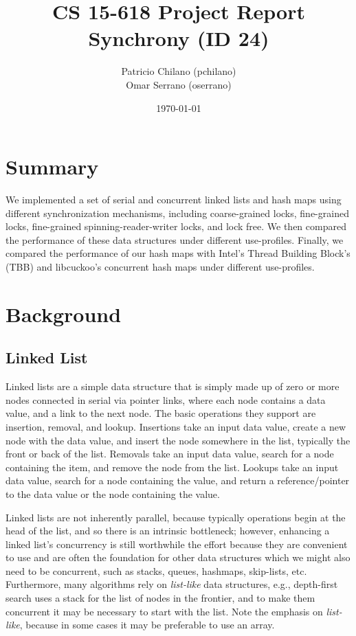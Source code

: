 \documentclass[11pt]{article}
\title{\vspace{-25pt}
\huge CS 15-618 Project Report \\
\huge Synchrony (ID 24)
}
\author{
    Patricio Chilano (pchilano) \\
    Omar Serrano (oserrano)
}
\date{\today}
\begin{document}


\maketitle

\section{Summary}
We implemented a set of serial and concurrent linked lists and hash maps using
different synchronization mechanisms, including coarse-grained locks,
fine-grained locks, fine-grained spinning-reader-writer locks, and lock free. We
then compared the performance of these data structures under different
use-profiles. Finally, we compared the performance of our hash maps with Intel's
Thread Building Block's (TBB) and libcuckoo's concurrent hash maps under different
use-profiles.

\section{Background}

\subsection{Linked List} \label{ssec:bglist}
Linked lists are a simple data structure that is simply made up of zero or more
nodes connected in serial via pointer links, where each node contains a data
value, and a link to the next node. The basic operations they support are
insertion, removal, and lookup. Insertions take an input data value, create a
new node with the data value, and insert the node somewhere in the list,
typically the front or back of the list. Removals take an input data value,
search for a node containing the item, and remove the node from the list.
Lookups take an input data value, search for a node containing the value, and
return a reference/pointer to the data value or the node containing the value.

Linked lists are not inherently parallel, because typically operations begin at
the head of the list, and so there is an intrinsic bottleneck; however,
enhancing a linked list's concurrency is still worthwhile the effort because
they are convenient to use and are often the foundation for other data
structures which we might also need to be concurrent, such as stacks, queues,
hashmaps, skip-lists, etc. Furthermore, many algorithms rely on {\em list-like}
data structures, e.g., depth-first search uses a stack for the list of nodes in
the frontier, and to make them concurrent it may be necessary to start with the
list. Note the emphasis on {\em list-like}, because in some cases it may be
preferable to use an array.
\end{document}
